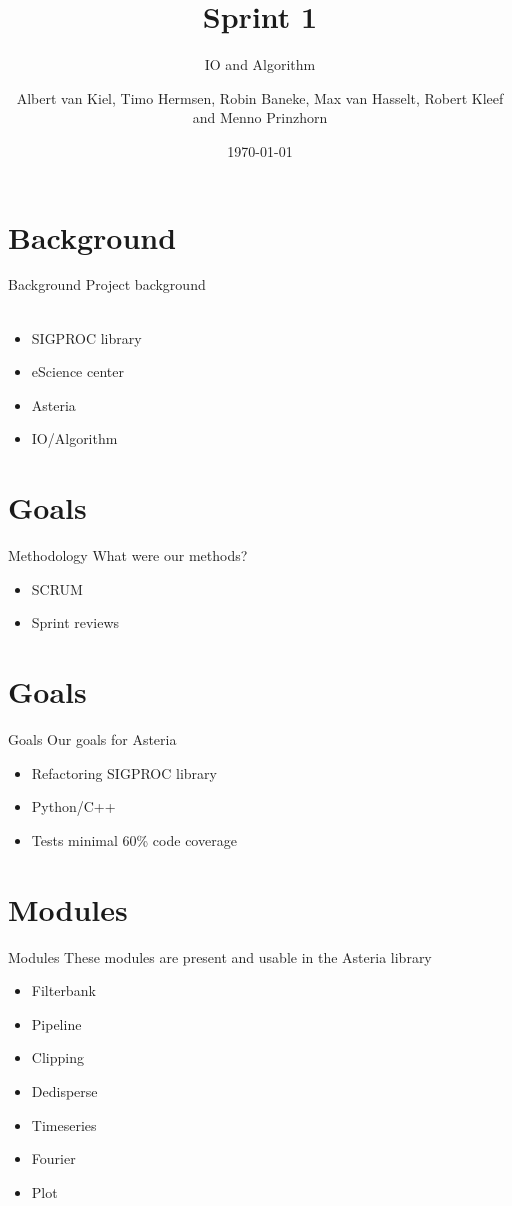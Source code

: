 \documentclass{beamer}
\title{Sprint 1}
\subtitle{IO and Algorithm}
\author{Albert van Kiel, Timo Hermsen, Robin Baneke, Max van Hasselt, Robert Kleef and Menno Prinzhorn}
\date{\today}
\begin{document}
\begin{frame}
    \titlepage
\end{frame}

\section{Background}
    
\begin{frame}{Background}
    Project background
    \\~\\
    \begin{itemize}
        \item SIGPROC library
        \item eScience center
        \item Asteria
        \item IO/Algorithm
    \end{itemize}
\end{frame}

\section{Goals}
	\begin{frame}{Methodology}
	What were our methods?     
	\begin{itemize}
		\item SCRUM
		\item Sprint reviews
	\end{itemize}
\end{frame}

\section{Goals}
\begin{frame}{Goals}
    Our goals for Asteria      
    \begin{itemize}
        \item Refactoring SIGPROC library
        \item Python/C++
        \item Tests minimal 60\% code coverage
    \end{itemize}
\end{frame}

\section{Modules}
\begin{frame}{Modules}
	These modules are present and usable in the Asteria library     
	\begin{itemize}
		\item Filterbank
		\item Pipeline
		\item Clipping
		\item Dedisperse
		\item Timeseries
		\item Fourier
		\item Plot
	\end{itemize}
\end{frame}
\end{document}
